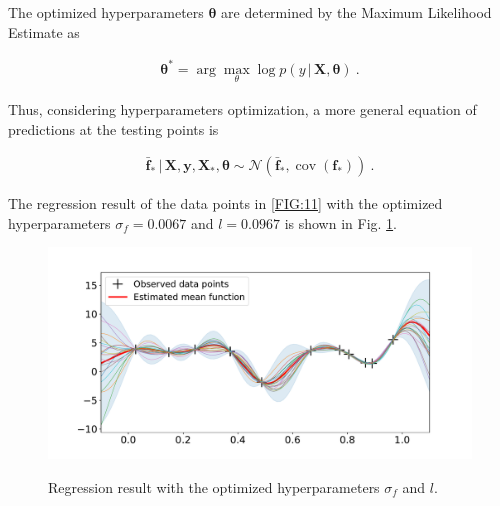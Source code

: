 \documentclass[12pt,letterpaper,fleqn,oneside,titlepage]{offroad-report}
\begin{document}
The optimized hyperparameters $\boldsymbol {\theta}$ are determined by the Maximum Likelihood Estimate as  
\begin{ceqn}
    \begin{align}
        \boldsymbol {\theta^*} = \arg\max\limits_{\theta} \log p(y \, \vert \, \mathbf{X}, \boldsymbol {\theta})  \ . \nonumber
    \end{align}
\end{ceqn}
Thus, considering hyperparameters optimization, a more general equation of predictions at the testing points is \cite{gpss2019}  
\begin{ceqn}
    \begin{align}
        \mathbf{\bar{f}_*} \, \vert \, \mathbf{X}, \mathbf{y}, \mathbf{X}_*,  \boldsymbol {\theta} \sim \mathcal{N} \left(\mathbf{\bar{f}_*}, \operatorname{cov}(\mathbf{f}_*)\right)  \ . \nonumber
    \end{align}
\end{ceqn}
The regression result of the data points in \ref{FIG:11} with the optimized hyperparameters $\sigma_f = 0.0067$ and $l = 0.0967$ is shown in Fig. \ref{FIG:12}. 

\begin{figure}[h!]
	\centering
		{{\includegraphics[trim=2.2cm 1.0cm 2.8cm 0.8cm, width=12cm]{figs/regression_gpflow.pdf}}}
	\caption{Regression result with the optimized hyperparameters $\sigma_f$ and $l$.}
	\label{FIG:12}
\end{figure}
\end{document}
